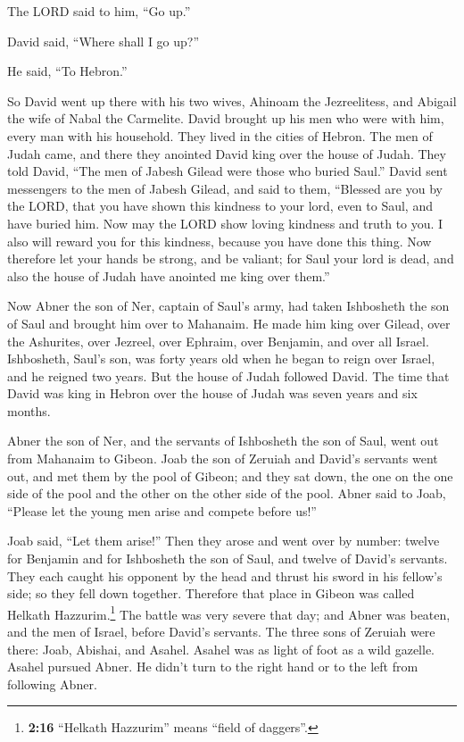 The LORD said to him, ``Go up.''

David said, ``Where shall I go up?''

He said, ``To Hebron.''

 So David went up there with his two wives, Ahinoam the
Jezreelitess, and Abigail the wife of Nabal the Carmelite.
 David brought up his men who were with him, every man
with his household. They lived in the cities of Hebron. 
The men of Judah came, and there they anointed David king over the house
of Judah. They told David, ``The men of Jabesh Gilead were those who
buried Saul.''  David sent messengers to the men of Jabesh
Gilead, and said to them, ``Blessed are you by the LORD, that you have
shown this kindness to your lord, even to Saul, and have buried him.
 Now may the LORD show loving kindness and truth to you. I
also will reward you for this kindness, because you have done this
thing.  Now therefore let your hands be strong, and be
valiant; for Saul your lord is dead, and also the house of Judah have
anointed me king over them.''

 Now Abner the son of Ner, captain of Saul's army, had
taken Ishbosheth the son of Saul and brought him over to Mahanaim.
 He made him king over Gilead, over the Ashurites, over
Jezreel, over Ephraim, over Benjamin, and over all Israel.
 Ishbosheth, Saul's son, was forty years old when he
began to reign over Israel, and he reigned two years. But the house of
Judah followed David.  The time that David was king in
Hebron over the house of Judah was seven years and six months.

 Abner the son of Ner, and the servants of Ishbosheth the
son of Saul, went out from Mahanaim to Gibeon.  Joab the
son of Zeruiah and David's servants went out, and met them by the pool
of Gibeon; and they sat down, the one on the one side of the pool and
the other on the other side of the pool.  Abner said to
Joab, ``Please let the young men arise and compete before us!''

Joab said, ``Let them arise!''  Then they arose and went
over by number: twelve for Benjamin and for Ishbosheth the son of Saul,
and twelve of David's servants.  They each caught his
opponent by the head and thrust his sword in his fellow's side; so they
fell down together. Therefore that place in Gibeon was called Helkath
Hazzurim.\footnote{\textbf{2:16} ``Helkath Hazzurim'' means ``field of
  daggers''.}  The battle was very severe that day; and
Abner was beaten, and the men of Israel, before David's servants.
 The three sons of Zeruiah were there: Joab, Abishai, and
Asahel. Asahel was as light of foot as a wild gazelle. 
Asahel pursued Abner. He didn't turn to the right hand or to the left
from following Abner.

